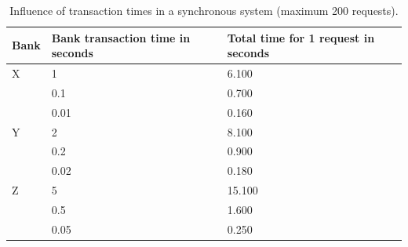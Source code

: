 \documentclass[10pt,a4paper,twocolumn]{article}
\begin{document}
\begin{center}
	\begin{table}[]
		\begin{tabular}{lll}
			Bank				& Bank transaction time in seconds & Total time for 1 request in seconds\\\hline
			X					 & 1 						  & 6.100 \\
			& 0.1 						& 0.700 \\
			& 0.01 					   & 0.160 \\\hline
			Y				   & 2 							& 8.100 \\
			& 0.2 						&  0.900\\
			& 0.02 					   & 0.180 \\\hline
			Z				   & 5 							& 15.100 \\
			& 0.5 						&  1.600\\
			& 0.05 					   & 0.250
		\end{tabular}
		\caption{\label{tab:banking-time-influence-synchronous}Influence of transaction times in a synchronous system (maximum 200 requests).}
	\end{table}
\end{center}

\noindent
\end{document}
